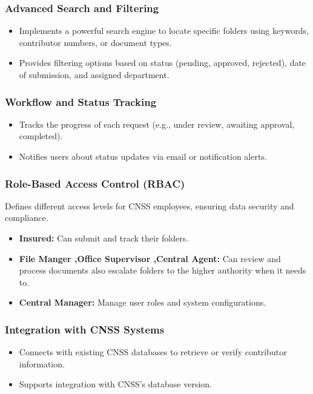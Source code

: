 \subsubsection{ Advanced Search and Filtering}
\begin{itemize}
    \item Implements a powerful search engine to locate specific folders using keywords, contributor numbers, or document types.
    \item Provides filtering options based on status (pending, approved, rejected), date of submission, and assigned department.
\end{itemize}

\subsubsection{ Workflow and Status Tracking}
\begin{itemize}
    \item Tracks the progress of each request (e.g., under review, awaiting approval, completed).
    \item Notifies users about status updates via email or notification alerts.
\end{itemize}

\subsubsection{ Role-Based Access Control (RBAC)}
Defines different access levels for CNSS employees, ensuring data security and compliance.
\begin{itemize}
    \item \textbf{Insured:} Can submit and track their folders.
    \item \textbf{File Manger ,Office Supervisor ,Central Agent:} Can review and process documents also escalate folders to the higher authority when it needs to.
    \item \textbf{Central Manager:} Manage user roles and system configurations.
    
\end{itemize}
\subsubsection{ Integration with CNSS Systems}
\begin{itemize}
    \item Connects with existing CNSS databases to retrieve or verify contributor information.
    \item Supports integration with CNSS’s database version.
\end{itemize}

